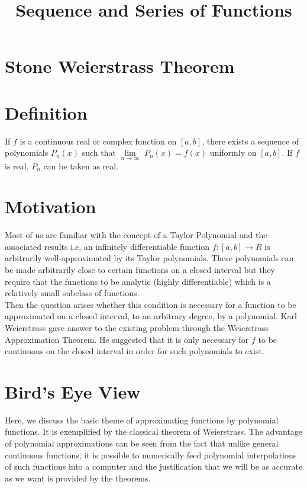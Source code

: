 \documentclass[12pt,a4paper]{article}
\title{\textbf{\textbf{Sequence and Series of Functions}}}
\author{}
\date{}
\begin{document}
\maketitle

\section*{Stone Weierstrass Theorem}
\section{Definition}
If $f$ is a continuous real or complex function on $[a,b]$, there exists a sequence of polynomials $P_n(x)$ such that $\lim\limits_{n\to \infty}$ $ P_n(x)=f(x)$ uniformly on $[a,b]$. If $f$ is real, $P_n$ can be taken as real. 
\section{Motivation}
Most of us are familiar with the concept of a Taylor Polynomial and the associated results i.e, an infinitely differentiable function $f: [a,b] \to R$ is arbitrarily well-approximated by its Taylor polynomials.
These polynomials can be made arbitrarily close to certain functions on a closed interval but they require that the functions to be analytic (highly differentiable) which is a relatively small subclass of functions.\\

Then the question arises whether this condition is necessary for a function to be approximated on a closed interval, to an arbitrary degree, by a polynomial. Karl Weierstrass gave answer to the existing problem through the Weierstrass Approximation Theorem. He suggested that it is only necessary for $f$ to be continuous on the closed interval in order for such polynomials to exist.\\ 
 
\section{Bird’s Eye View}
Here, we discuss the basic theme of approximating functions by polynomial functions. It is exemplified by the classical theorem of Weierstrass. The advantage of polynomial approximations can be seen from the fact that unlike general continuous functions, it is possible to numerically feed polynomial interpolations of such functions into a computer and the justification that we will be as accurate as we want is provided by the theorems.
\end{document}
